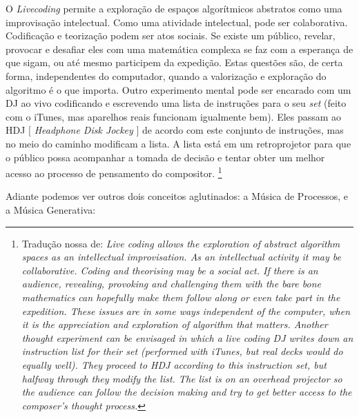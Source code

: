 \begin{citacao}
O \emph{Livecoding} permite a exploração de espaços algorítmicos abstratos como uma improvisação intelectual. Como uma atividade intelectual, pode ser colaborativa. Codificação e teorização podem ser atos sociais. Se existe um público, revelar, provocar e desafiar eles com uma matemática complexa se faz com a esperança de que sigam, ou até mesmo participem da expedição. Estas questões são, de certa forma, independentes do computador, quando a valorização e exploração do algoritmo é o que importa. Outro experimento mental pode ser encarado com um DJ ao vivo codificando e escrevendo uma lista de instruções para o seu \emph{set} (feito com o iTunes, mas aparelhos reais funcionam igualmente bem). Eles passam ao HDJ $[$ \emph{Headphone Disk Jockey} $]$ de acordo com este conjunto de instruções, mas no meio do caminho modificam a lista. A lista está em um retroprojetor para que o público possa acompanhar a tomada de decisão e tentar obter um melhor acesso ao processo de pensamento do compositor. \cite[p.~245]{ward_live_2004} \footnote{Tradução nossa de: \emph{Live coding allows the exploration of abstract algorithm spaces as an intellectual improvisation. As an intellectual activity it may be collaborative. Coding and theorising may be a social act. If there is an audience, revealing, provoking and challenging them with the bare bone mathematics can hopefully make them follow along or even take part in the expedition. These issues are in some ways independent of the computer, when it is the appreciation and exploration of algorithm that matters.   Another thought experiment can be envisaged in which a live coding DJ writes down an instruction list for their set (performed with iTunes, but real decks would do equally well). They proceed to HDJ according to this instruction set, but halfway through they modify the list. The list is on an overhead projector so the audience can follow the decision making and try to get better access to the composer’s thought process.}}
\end{citacao}

Adiante podemos ver outros dois conceitos aglutinados: a Música de Processos, e a Música Generativa:


